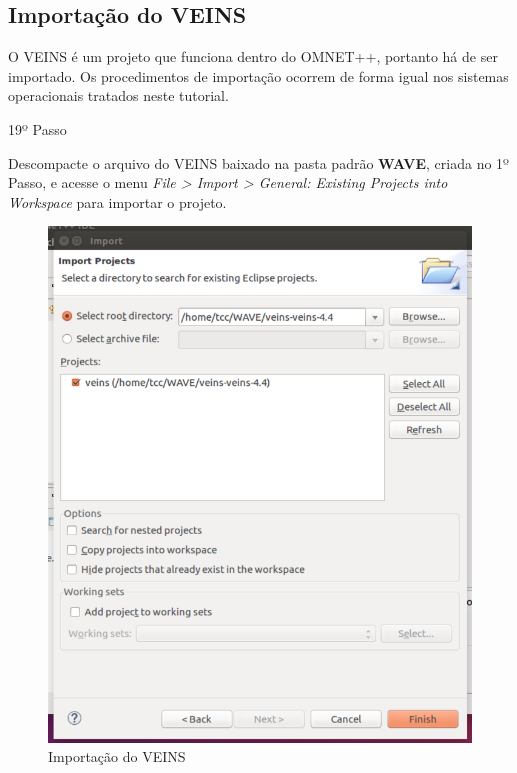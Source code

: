 \documentclass[
12pt,				%
openright,			%
oneside,			%
a4paper,			%
brazil,				%
]{abntex2}
\begin{document}
{\begin{anexosenv}
        	\section{Importação do VEINS}
        	
        	    \par O VEINS é um projeto que funciona dentro do OMNET++, portanto há de ser importado. Os procedimentos de importação ocorrem de forma igual nos sistemas operacionais tratados neste tutorial.

            	\begin{description}
	                \item[19º Passo]
	            \end{description}
	            \par Descompacte o arquivo do VEINS baixado na pasta padrão \textbf{WAVE}, criada no 1º Passo, e acesse o menu \textit{File > Import > General: Existing Projects into Workspace} para importar o projeto. %
		            
                \begin{figure} [H]
	                \centering
	                \includegraphics[scale=.35]{figuras/aneB/59ImportandoVeins}
	                \caption{\label{fig_59}Importação do VEINS}
                \end{figure}
		            

\end{anexosenv}}
\end{document}
